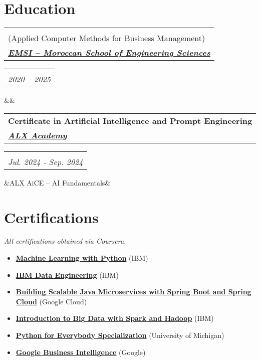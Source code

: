 \documentclass[10pt,a4paper,sans]{moderncv}
\makeatletter
\newcommand*{\customcventry}[7][.10em]{%
\begin{tabular}{@{}l}
    {\bfseries #4} \\
    {\itshape #3}
\end{tabular}
\hfill
\begin{tabular}{l@{}}
    {\bfseries #5} \\
    {\itshape #2}
\end{tabular}
\ifx&#7&%
\else{\\
\begin{minipage}{\maincolumnwidth}%
    \footnotesize#7%
\end{minipage}}\fi%
\par\addvspace{#1}
}
\makeatother
\begin{document}
\vspace{-16pt}
\section{\fontsize{11}{12.1}\selectfont Education}
\vspace{-4pt}
\customcventry{2020 -- 2025}{\href{https://emsi.ma}{\textbf{EMSI – Moroccan School of Engineering Sciences}}}{Master MIAGE Software Engineering and Networks \\ (Applied Computer Methods for Business Management)}{}{}{}
\customcventry{Jul. 2024 ‐ Sep. 2024}{\href{https://www.alxafrica.com}{\textbf{ALX Academy}}}{Certificate in Artificial Intelligence and Prompt Engineering}{}{}{ALX AiCE – AI Fundamentals}


\vspace{-18pt}
\section{\fontsize{11}{12.1}\selectfont Certifications}
\vspace{-5pt}
    \textit{All certifications obtained via Coursera.}
\begin{itemize}[leftmargin=0.3cm, itemsep=-2pt, topsep=0pt, partopsep=0pt, parsep=0pt]
    \item \textbf{\href{https://www.coursera.org/account/accomplishments/verify/G178XXP17WQA}{Machine Learning with Python}} (IBM)
    \item \textbf{\href{https://www.coursera.org/account/accomplishments/records/M5RKGX36BAVA}{IBM Data Engineering}} (IBM)
    \item \textbf{\href{https://google.com}{Building Scalable Java Microservices with Spring Boot and Spring Cloud}} (Google Cloud)
    \item \textbf{\href{https://www.coursera.org/account/accomplishments/verify/EK5SJM3YM7PX}{Introduction to Big Data with Spark and Hadoop}} (IBM)
    \item \textbf{\href{https://www.coursera.org/account/accomplishments/specialization/B4RCUAYCUG49}{Python for Everybody Specialization}} (University of Michigan)
    \item \textbf{\href{https://www.coursera.org/account/accomplishments/records/G867SJLRFQS2}{Google Business Intelligence}} (Google)
\end{itemize}


\vspace{-19pt}
\end{document}
